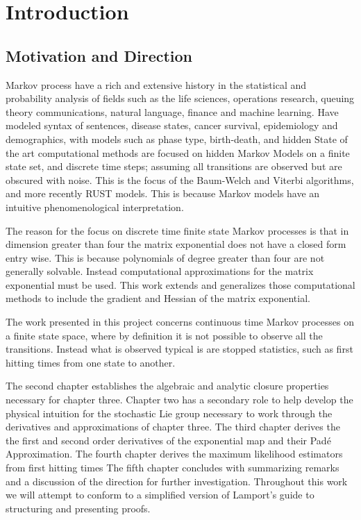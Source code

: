 \chapter{Introduction}
\section{Motivation and Direction}
Markov process have a rich and extensive history in the statistical and 
probability analysis of fields such as the life sciences, operations research,
queuing theory communications, natural language, finance and machine learning.
Have modeled syntax of sentences, disease states, cancer survival, epidemiology
and demographics, with models such as phase type, birth-death, and hidden
State of the art computational methods are focused on hidden Markov Models on
a finite state set, and discrete time steps; assuming all transitions are
observed but are obscured with noise. This is the focus of the Baum-Welch and
Viterbi algorithms, and more recently RUST models. This is because Markov models
have an intuitive phenomenological interpretation.

The reason for the focus on discrete time finite state Markov processes is that
in dimension greater than four the matrix exponential does not have a closed form
entry wise. This is because polynomials of degree greater than four are not
generally solvable. Instead computational approximations for the matrix
exponential must be used. This work extends and generalizes those computational
methods to include the gradient and Hessian of the matrix exponential.

The work presented in this project concerns continuous time Markov processes on
a finite state space, where by definition it is not possible to observe all the
transitions. Instead what is observed typical is are stopped statistics, such
as first hitting times from one state to another.

The second chapter establishes the algebraic and analytic closure properties
necessary for chapter three. Chapter two has a secondary role to help develop the 
physical intuition for the stochastic Lie group necessary to work through the 
derivatives and approximations of chapter three.
The third chapter derives the the first and second order derivatives of the exponential
map and their Pad\'{e} Approximation.
The fourth chapter derives the maximum likelihood estimators from first hitting times
The fifth chapter concludes with summarizing remarks and a discussion of the direction
for further investigation.
Throughout this work we will attempt to conform to a simplified version of 
Lamport's guide to structuring and presenting proofs\cite{hall_elementary_2000}.
